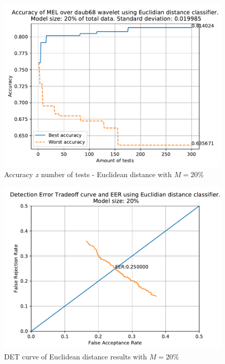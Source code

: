 		\begin{figure}[H]
			\centering
			\includegraphics[scale=.8]{images/results/confusionMatrices/classifier_Euclidian_20.pdf}
			\caption{Accuracy \textit {x} number of tests - Euclidean distance with $M=20\%$}
			\label{fig:classifiereuclidian20}
		\end{figure}
		\begin{figure}[H]
			\centering
			\includegraphics[scale=.8]{images/results/det/DET_for_classifier_Euclidian_20.pdf}
			\caption{DET curve of Euclidean distance results with $M=20\%$}
			\label{fig:detforclassifiereuclidian20}
		\end{figure}
	
